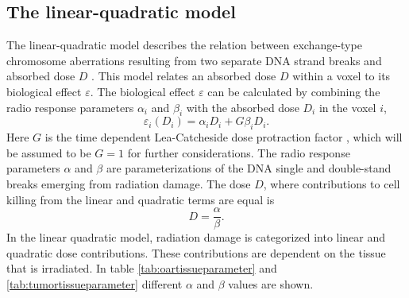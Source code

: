 \subsection{The linear-quadratic model}
The linear-quadratic model describes the relation between exchange-type chromosome aberrations resulting from two separate DNA strand breaks and absorbed dose $D$ \cite{Hall}. This model relates an absorbed dose $D$ within a voxel to its biological effect $\varepsilon$. The biological effect $\varepsilon$ can be calculated by combining  the radio response parameters $\alpha_i$ and $\beta_i$ with the absorbed dose $D_i$ in the voxel $i$,
\begin{equation}
\varepsilon_i(D_i) = \alpha_i D_i + G\beta_i D_i.
\end{equation}
Here $G$ is the time dependent Lea-Catcheside dose protraction factor \cite{pmid9343102}, which will be assumed to be $G=1$ for further considerations. The radio response parameters $\alpha$ and $\beta$ are parameterizations of the DNA single and double-stand breaks emerging from radiation damage. The dose $D$, where contributions to cell killing from the linear and quadratic terms are equal is
\begin{equation}
D = \frac{\alpha}{\beta}.
\end{equation}
In the linear quadratic model, radiation damage is categorized into linear and quadratic dose contributions. These contributions are dependent on the tissue that is irradiated. In table \ref{tab:oartissueparameter} and \ref{tab:tumortissueparameter} different $\alpha$ and $\beta$ values are shown.
